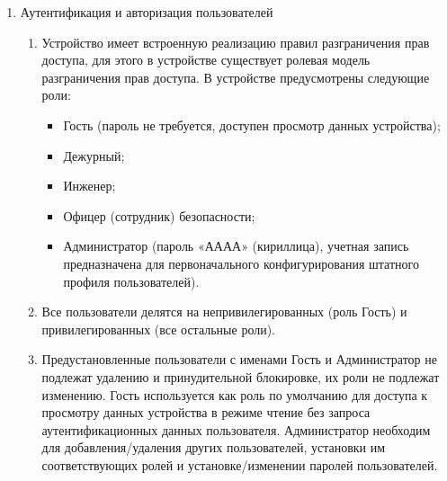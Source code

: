 \begin{enumerate}[label=\arabic{section}.\arabic{subsection}.\arabic*, labelsep=4pt, leftmargin=0pt, itemindent=57pt]
\begin{enumerate}[label=\arabic{section}.\arabic{subsection}.\arabic{enumi}.\arabic*, labelsep=4pt, leftmargin=0em, itemindent=65pt, parsep=0pt]
\item
В случае появления некритической ошибки активируется внутренний сигнал «Некритическая ошибка», производится запись в журнал событий, алгоритмы основных функций в составе устройства продолжают выполняться, это состояние устройства сигнализируется свечением светодиода «Неисправность» и отсутствием свечения светодиода «Готовность».
Устройство может выйти из режима предупредительной сигнализации без активных действий со стороны пользователя по факту пропадания критериев режима.

\end{enumerate}

\item Аутентификация и авторизация пользователей
\begin{enumerate}[label=\arabic{section}.\arabic{subsection}.\arabic{enumi}.\arabic*, labelsep=4pt, leftmargin=0em, itemindent=65pt, parsep=0pt]

\item Устройство имеет встроенную реализацию правил разграничения прав доступа, для этого в устройстве существует ролевая модель разграничения прав доступа.
В устройстве предусмотрены следующие роли:
\begin{itemize}
\item Гость (пароль не требуется, доступен просмотр данных устройства);
\item Дежурный;
\item Инженер;
\item Офицер (сотрудник) безопасности;
\item Администратор (пароль «АААА» (кириллица), учетная запись предназначена для первоначального конфигурирования штатного профиля пользователей).
\end{itemize}

\item Все пользователи делятся на непривилегированных (роль Гость) и привилегированных (все остальные роли).

\item
Предустановленные пользователи с именами Гость и Администратор не подлежат удалению и принудительной блокировке, их роли не подлежат изменению.
Гость используется как роль по умолчанию для доступа к просмотру данных устройства в режиме чтение без запроса аутентификационных данных пользователя.
Администратор необходим для добавления/удаления других пользователей, установки им соответствующих ролей и установке/изменении паролей пользователей.


\end{enumerate}
\end{enumerate}
